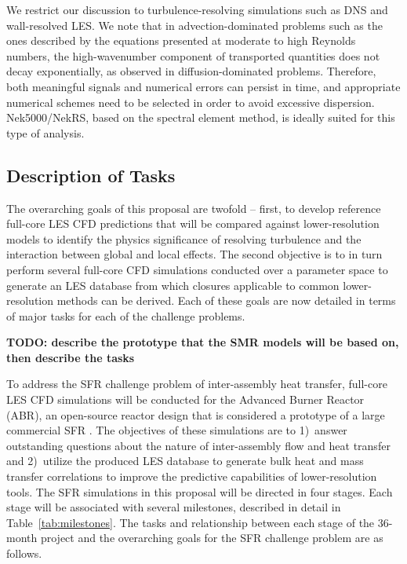 We restrict our discussion to turbulence-resolving simulations such as DNS and wall-resolved LES. We note that in advection-dominated problems such as the ones described by the equations presented at moderate to high Reynolds numbers, the high-wavenumber component of transported quantities does not decay exponentially, as observed in diffusion-dominated problems. Therefore, both meaningful signals and numerical errors can persist in time, and appropriate numerical schemes need to be selected in order to avoid excessive dispersion. Nek5000/NekRS, based on the spectral element method, is ideally suited for this type of analysis.

\vspace{-.25in}
\subsection{Description of Tasks}
\vspace{-.2in}


The overarching goals of this proposal are twofold -- first, to develop reference full-core LES CFD predictions that will be compared against lower-resolution models to identify the physics significance of resolving turbulence and the interaction between global and local effects. The second objective is to in turn perform several full-core CFD simulations conducted over a parameter space to generate an LES database from which closures applicable to common lower-resolution methods can be derived. Each of these goals are now detailed in terms of major tasks for each of the challenge problems.

{\bf TODO: describe the prototype that the SMR models will be based on, then describe the tasks}

To address the SFR challenge problem of inter-assembly heat transfer, full-core LES CFD simulations will be conducted for the Advanced Burner Reactor (ABR), an open-source reactor design that is considered a prototype of a large commercial SFR \cite{abr}. The objectives of these simulations are to 1)~answer outstanding questions about the nature of inter-assembly flow and heat transfer and 2)~utilize the produced LES database to generate bulk heat and mass transfer correlations to improve the predictive capabilities of lower-resolution tools. The SFR simulations in this proposal will be directed in four stages. Each stage will be associated with several milestones, described in detail in Table~\ref{tab:milestones}. The tasks and relationship between each stage of the 36-month project and the overarching goals for the SFR challenge problem are as follows.

